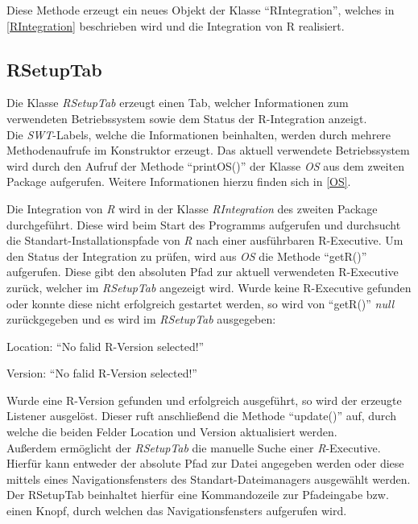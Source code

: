 \documentclass[a4paper, 12pt]{report} %
\begin{document}
Diese Methode erzeugt ein neues Objekt der Klasse "`RIntegration"', welches in \ref{RIntegration} beschrieben wird und die Integration von R realisiert.

\subsection{RSetupTab}

Die Klasse \textit{RSetupTab} erzeugt einen Tab, welcher Informationen zum verwendeten Betriebssystem sowie dem Status der R-Integration anzeigt.\\

Die \textit{SWT}-Labels, welche die Informationen beinhalten, werden durch mehrere Methodenaufrufe im Konstruktor erzeugt.
Das aktuell verwendete Betriebssystem wird durch den Aufruf der Methode "`printOS()"' der Klasse \textit{OS} aus dem zweiten Package aufgerufen. Weitere Informationen hierzu finden sich in \ref{OS}.

Die Integration von \textit{R} wird in der Klasse \textit{RIntegration} des zweiten Package durchgeführt. Diese wird beim Start des Programms aufgerufen und durchsucht die Standart-Installationspfade von \textit{R} nach einer ausführbaren R-Executive.
 Um den Status der Integration zu prüfen, wird aus \textit{OS} die Methode "`getR()"' aufgerufen. Diese gibt den absoluten Pfad zur aktuell verwendeten R-Executive zurück, welcher im \textit{RSetupTab} angezeigt wird.
Wurde keine R-Executive gefunden oder konnte diese nicht erfolgreich gestartet werden, so wird von "`getR()"' \textit{null} zurückgegeben und es wird im \textit{RSetupTab} ausgegeben:  
\begin{center}
Location: "`No falid R-Version selected!"'

Version: "`No falid R-Version selected!"'
\end{center}

Wurde eine R-Version gefunden und erfolgreich ausgeführt, so wird der erzeugte Listener ausgelöst. Dieser ruft anschließend die Methode "`update()"' auf, durch welche die beiden Felder Location und Version aktualisiert werden.\\

Außerdem ermöglicht der \textit{RSetupTab} die manuelle Suche einer \textit{R}-Executive. Hierfür kann entweder der absolute Pfad zur Datei angegeben werden oder diese mittels eines Navigationsfensters des Standart-Dateimanagers ausgewählt werden.
Der RSetupTab beinhaltet hierfür eine Kommandozeile zur Pfadeingabe bzw. einen Knopf, durch welchen das Navigationsfensters aufgerufen wird.
\end{document}
